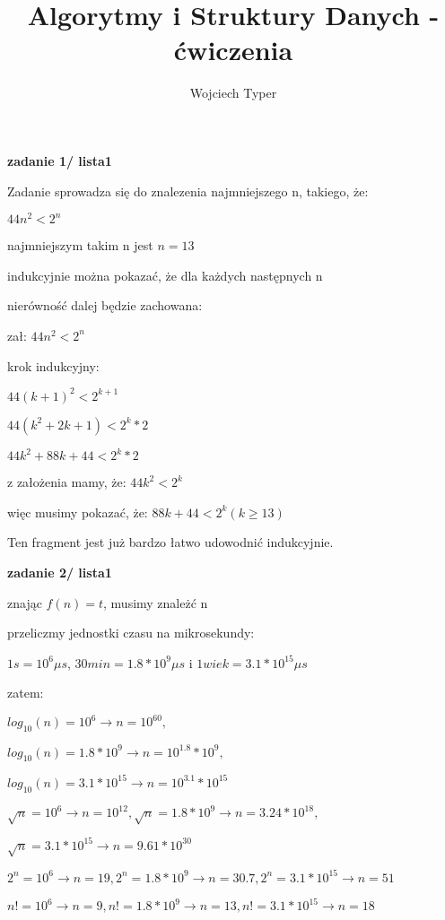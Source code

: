 \documentclass{article}
\title{Algorytmy i Struktury Danych - ćwiczenia}
\author{Wojciech Typer}
\date{}
\begin{document}
\maketitle
\textbf{zadanie 1/ lista1} \par
Zadanie sprowadza się do znalezenia najmniejszego n, 
takiego, że: \par
$44n^2 < 2^n$ \par
najmniejszym takim n jest $n = 13$ \par
indukcyjnie można pokazać, że dla każdych następnych n \par
nierówność dalej będzie zachowana: \par
zał: $44n^2 < 2^n$ \par
krok indukcyjny: \par
$44(k + 1)^2 < 2^{k + 1}$ \par
$44(k^2 + 2k + 1) < 2^k * 2$ \par
$44k^2 + 88k + 44 < 2^k * 2$ \par
z założenia mamy, że: $44k^2 < 2^k$ \par
więc musimy pokazać, że: $88k + 44 < 2^k (k \geq 13)$ \par
Ten fragment jest już bardzo łatwo udowodnić indukcyjnie.  \par

\vspace{1\baselineskip}
\textbf{zadanie 2/ lista1} \par
znając $f(n) = t$, musimy znależć n \par
przeliczmy jednostki czasu na mikrosekundy: \par
$1s = 10^6 \mu s$, $30min = 1.8 * 10^9 \mu s$ i $1 wiek = 3.1 * 10^{15} \mu s$\par
zatem: \par
$log_{10}(n) = 10^6  \rightarrow n = 10^{60},$ \par $ log_{10}(n) = 1.8 * 10^9  \rightarrow n = 10^1.8 * 10^9,$ \par $ log_{10}(n) = 3.1 * 10^{15}  \rightarrow n = 10^3.1 * 10^{15}$ \par
$\sqrt{n} = 10^6  \rightarrow n = 10^{12}, \sqrt{n} = 1.8 * 10^9  \rightarrow n = 3.24 * 10^{18},$ \par $ \sqrt{n} = 3.1 * 10^{15}  \rightarrow n = 9.61 * 10^{30}$ \par
$2^n = 10^6  \rightarrow n = 19, 2^n = 1.8 * 10^9  \rightarrow n = 30.7, 2^n = 3.1 * 10^{15}  \rightarrow n = 51$ \par
$n! = 10^6  \rightarrow n = 9, n! = 1.8 * 10^9  \rightarrow n = 13, n! = 3.1 * 10^{15}  \rightarrow n = 18$ \par
\end{document}
